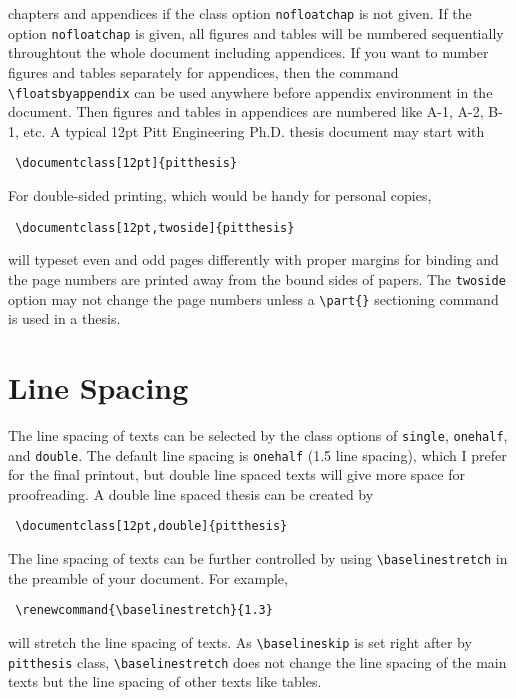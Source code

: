 chapters and appendices if the class option \texttt{nofloatchap} is not given.
If the option \texttt{nofloatchap} is given, all figures and tables will be
numbered sequentially throughtout the whole document including appendices.
If you want to number figures and tables separately for appendices, then the
command \verb|\floatsbyappendix| can be used anywhere before appendix
environment in the document. Then figures and tables in appendices are numbered
like A-1, A-2, B-1, etc.
A typical 12pt Pitt Engineering Ph.D. thesis document may start with
\begin{verbatim}
 \documentclass[12pt]{pitthesis}
\end{verbatim}
For double-sided printing, which would be handy for personal copies,
\begin{verbatim}
 \documentclass[12pt,twoside]{pitthesis}
\end{verbatim}
will typeset even and odd pages differently with proper margins for binding
and the page numbers are printed away from the bound sides of papers.
The \texttt{twoside} option may not change the page numbers unless
a \verb|\part{}| sectioning command is used in a thesis.

\section{Line Spacing}
The line spacing of texts can be selected by the class options of
\texttt{single}, \texttt{onehalf}, and \texttt{double}.  The default line
spacing is \texttt{onehalf} (1.5 line spacing), which I prefer for the final
printout, but double line spaced texts will give more space for proofreading.
A double line spaced thesis can be created by
\begin{verbatim}
 \documentclass[12pt,double]{pitthesis}
\end{verbatim}
The line spacing of texts can be further controlled by using
\verb|\baselinestretch| in the preamble of your document.  For example,
\begin{verbatim}
 \renewcommand{\baselinestretch}{1.3}
\end{verbatim}
will stretch the line spacing of texts.  As \verb|\baselineskip| is set
right after \verb|| by \texttt{pitthesis} class,
\verb|\baselinestretch| does not change the line spacing of the main texts
but the line spacing of other texts like tables.

